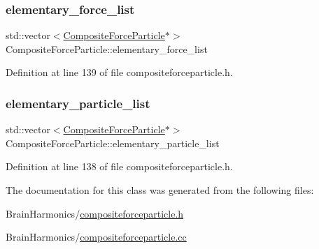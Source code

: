 \subsubsection{\texorpdfstring{elementary\+\_\+force\+\_\+list}{elementary\_force\_list}}
{\footnotesize\ttfamily std\+::vector$<$\mbox{\hyperlink{class_composite_force_particle}{Composite\+Force\+Particle}}$\ast$$>$ Composite\+Force\+Particle\+::elementary\+\_\+force\+\_\+list\hspace{0.3cm}{\ttfamily [protected]}}



Definition at line 139 of file compositeforceparticle.\+h.

\mbox{\label{class_composite_force_particle_a1f5ab59857b8517af69205178f04abe9}} 
\subsubsection{\texorpdfstring{elementary\+\_\+particle\+\_\+list}{elementary\_particle\_list}}
{\footnotesize\ttfamily std\+::vector$<$\mbox{\hyperlink{class_composite_force_particle}{Composite\+Force\+Particle}}$\ast$$>$ Composite\+Force\+Particle\+::elementary\+\_\+particle\+\_\+list\hspace{0.3cm}{\ttfamily [protected]}}



Definition at line 138 of file compositeforceparticle.\+h.



The documentation for this class was generated from the following files\+:\begin{DoxyCompactItemize}
\item 
Brain\+Harmonics/\mbox{\hyperlink{compositeforceparticle_8h}{compositeforceparticle.\+h}}\item 
Brain\+Harmonics/\mbox{\hyperlink{compositeforceparticle_8cc}{compositeforceparticle.\+cc}}\end{DoxyCompactItemize}
